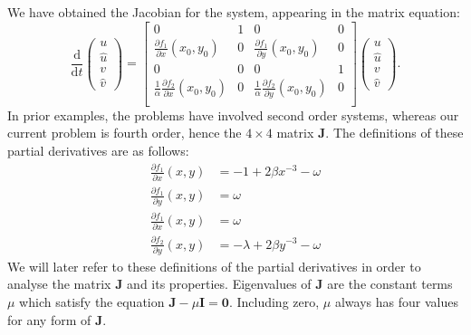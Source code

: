 \documentclass{report}
\begin{document}
We have obtained the Jacobian for the system, appearing in the matrix equation:
\begin{equation}
    \frac{\mathrm{d}}{\mathrm{d}t} \begin{pmatrix}
        u \\
        \hat{u} \\
        v \\
        \hat{v}
    \end{pmatrix} = \begin{bmatrix}
        0 & 1 & 0 & 0 \\
        \frac{\partial f_1}{\partial x}(x_0,y_0) & 0 & \frac{\partial f_1}{\partial y}(x_0,y_0) & 0 \\
        0 & 0 & 0 & 1 \\
        \frac{1}{\alpha}\frac{\partial f_2}{\partial x}(x_0,y_0) & 0 & \frac{1}{\alpha}\frac{\partial f_2}{\partial y}(x_0,y_0) & 0 \\
    \end{bmatrix} \begin{pmatrix}
        u \\
        \hat{u} \\
        v \\
        \hat{v}
    \end{pmatrix}.
    \label{eqn:twomass_matrix_jacobian_quad}
\end{equation}
In prior examples, the problems have involved second order systems,
whereas our current problem is fourth order,
hence the \(4\times4\) matrix \(\mathbf{J}\).
The definitions of these partial derivatives are as follows:
\begin{equation}
    \begin{aligned}
        \frac{\partial f_1}{\partial x}(x,y) &= -1 + 2\beta x^{-3} - \omega \\
        \frac{\partial f_1}{\partial y}(x,y) &= \omega \\
        \frac{\partial f_1}{\partial x}(x,y) &= \omega \\
        \frac{\partial f_2}{\partial y}(x,y) &= -\lambda +2\beta y^{-3} - \omega
    \end{aligned}
    \label{eqn:twomass_partial_derivatives}
\end{equation}
We will later refer to these definitions of the partial derivatives in order to analyse the matrix $\mathbf{J}$ and its properties.
Eigenvalues of $\mathbf{J}$ are the constant terms $\mu$ which satisfy the equation $\mathbf{J} - \mu \mathbf{I} = \mathbf{0}$.
Including zero, $\mu$ always has four values for any form of $\mathbf{J}$.
\end{document}
